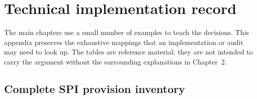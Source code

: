 \chapter{Technical implementation record}
\label{app:implementation-record}

The main chapters use a small number of examples to teach the decisions. This
appendix preserves the exhaustive mappings that an implementation or audit may
need to look up. The tables are reference material; they are not intended to
carry the argument without the surrounding explanations in Chapter~2.

\section{Complete SPI provision inventory}
\begingroup\small
